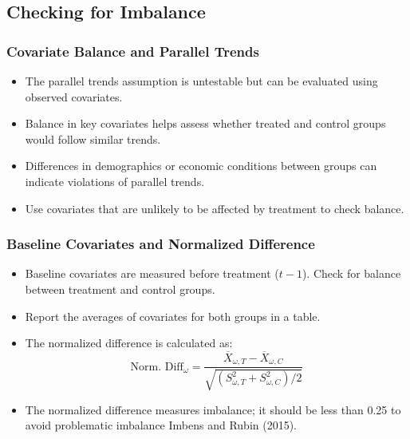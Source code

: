 \documentclass{beamer}
\begin{document}
\subsection{Checking for Imbalance}

\begin{frame}
    \frametitle{Covariate Balance and Parallel Trends}
    \begin{itemize}
        \item The parallel trends assumption is untestable but can be evaluated using observed covariates.
        \item Balance in key covariates helps assess whether treated and control groups would follow similar trends.
        \item Differences in demographics or economic conditions between groups can indicate violations of parallel trends.
        \item Use covariates that are unlikely to be affected by treatment to check balance.
    \end{itemize}
\end{frame}


\begin{frame}
    \frametitle{Baseline Covariates and Normalized Difference}
    \begin{itemize}
        \item Baseline covariates are measured before treatment ($t-1$). Check for balance between treatment and control groups.
        \item Report the averages of covariates for both groups in a table.
        \item The normalized difference is calculated as:
        $$ \text{Norm. Diff}_\omega = \frac{\overline{X}_{\omega,T} - \overline{X}_{\omega,C}}{\sqrt{(S_{\omega,T}^2 + S_{\omega,C}^2)/2}} $$
        \item The normalized difference measures imbalance; it should be less than 0.25 to avoid problematic imbalance Imbens and Rubin (2015).
    \end{itemize}
\end{frame}
\end{document}
